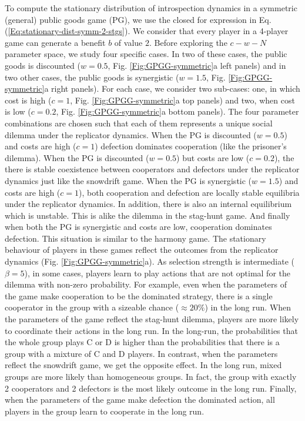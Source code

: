 \documentclass[11pt]{article}
\theoremstyle{plainCl1}
\theoremstyle{plainCl2}
\newcommand{\C}{\mathrm{C}}
\newcommand{\D}{\mathrm{D}}
\begin{document}
\noindent To compute the stationary distribution of introspection dynamics in a symmetric (general) public goods game (PG), we use the closed for expression in Eq. (\ref{Eq:stationary-dist-symm-2-stgs}). We consider that every player in a 4-player game can generate a benefit $b$ of value $2$. Before exploring the $c-w-N$ parameter space, we study four specific cases.  In two of these cases, the public goods is discounted ($w = 0.5$, Fig. \ref{Fig:GPGG-symmetric}a left panels) and in two other cases, the public goods is synergistic ($w = 1.5$, Fig. \ref{Fig:GPGG-symmetric}a right panels). For each case, we consider two sub-cases: one, in which cost is high ($c = 1$,  Fig. \ref{Fig:GPGG-symmetric}a top panels) and two, when cost is low ($c = 0.2$, Fig. \ref{Fig:GPGG-symmetric}a bottom panels). The four parameter combinations are chosen such that each of them represents a unique social dilemma under the replicator dynamics.  When the PG is discounted ($w = 0.5$) and costs are high ($c = 1$) defection dominates cooperation (like the prisoner's dilemma). When the PG is discounted ($w = 0.5$) but costs are low ($c = 0.2$), the there is stable coexistence between cooperators and defectors under the replicator dynamics just like the snowdrift game. When the PG is synergistic ($w = 1.5$) and costs are high ($c = 1$), both cooperation and defection are locally stable equilibria under the replicator dynamics. In addition, there is also an internal equilibrium which is unstable. This is alike the dilemma in the stag-hunt game. And finally when both the PG is synergistic and costs are low, cooperation dominates defection. This situation is similar to the harmony game. The stationary behaviour of players in these games reflect the outcomes from the replicator dynamics (Fig. \ref{Fig:GPGG-symmetric}a). As selection strength is intermediate ($\beta = 5$), in some cases, players learn to play actions that are not optimal for the dilemma with non-zero probability. For example, even when the parameters of the game make cooperation to be the dominated strategy, there is a single cooperator in the group with a sizeable chance ($\approx 20\%$) in the long run. When the parameters of the game reflect the stag-hunt dilemma, players are more likely to coordinate their actions in the long run. In the long-run, the probabilities that the whole group plays $\C$ or $\D$ is higher than the probabilities that there is a group with a mixture of $\C$ and $\D$ players. In contrast, when the parameters reflect the snowdrift game, we get the opposite effect. In the long run, mixed groups are more likely than homogeneous groups. In fact, the group with exactly 2 cooperators and 2 defectors is the most likely outcome in the long run. Finally, when the parameters of the game make defection the dominated action, all players in the group learn to cooperate in the long run. \\ \\ 
\end{document}
